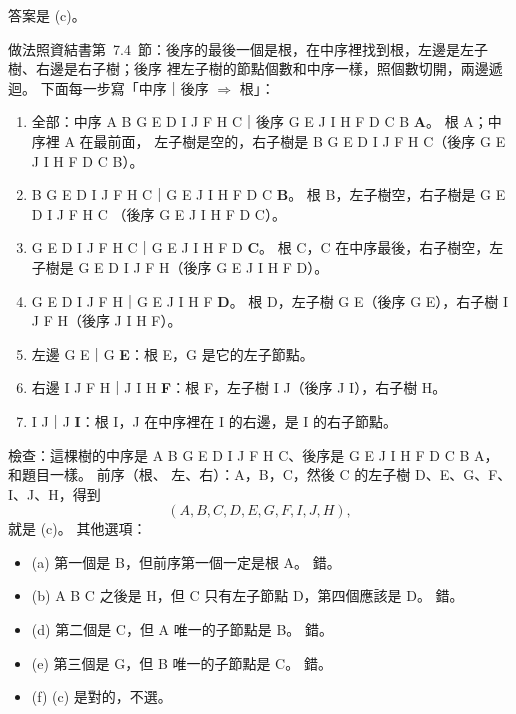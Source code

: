 \begin{pastsoln}
答案是 (c)。

做法照資結書第~7.4~節：後序的最後一個是根，在中序裡找到根，左邊是左子樹、右邊是右子樹；後序
裡左子樹的節點個數和中序一樣，照個數切開，兩邊遞迴。 下面每一步寫「中序｜後序 $\Rightarrow$ 根」：

\begin{enumerate}
\item 全部：中序 A B G E D I J F H C｜後序 G E J I H F D C B \textbf{A}。 根 A；中序裡 A 在最前面，
左子樹是空的，右子樹是 B G E D I J F H C（後序 G E J I H F D C B）。
\item B G E D I J F H C｜G E J I H F D C \textbf{B}。 根 B，左子樹空，右子樹是 G E D I J F H C
（後序 G E J I H F D C）。
\item G E D I J F H C｜G E J I H F D \textbf{C}。 根 C，C 在中序最後，右子樹空，左子樹是
G E D I J F H（後序 G E J I H F D）。
\item G E D I J F H｜G E J I H F \textbf{D}。 根 D，左子樹 G E（後序 G E），右子樹 I J F H（後序
J I H F）。
\item 左邊 G E｜G \textbf{E}：根 E，G 是它的左子節點。
\item 右邊 I J F H｜J I H \textbf{F}：根 F，左子樹 I J（後序 J I），右子樹 H。
\item I J｜J \textbf{I}：根 I，J 在中序裡在 I 的右邊，是 I 的右子節點。
\end{enumerate}

\begin{center}
\end{center}

檢查：這棵樹的中序是 A B G E D I J F H C、後序是 G E J I H F D C B A，和題目一樣。 前序（根、
左、右）：A，B，C，然後 C 的左子樹 D、E、G、F、I、J、H，得到
\[
(A, B, C, D, E, G, F, I, J, H),
\]
就是 (c)。 其他選項：
\begin{itemize}
\item (a) 第一個是 B，但前序第一個一定是根 A。 錯。
\item (b) A B C 之後是 H，但 C 只有左子節點 D，第四個應該是 D。 錯。
\item (d) 第二個是 C，但 A 唯一的子節點是 B。 錯。
\item (e) 第三個是 G，但 B 唯一的子節點是 C。 錯。
\item (f) (c) 是對的，不選。
\end{itemize}
\end{pastsoln}
